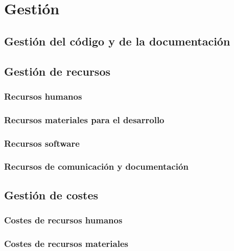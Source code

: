 \chapter{Gestión}

\section{Gestión del código y de la documentación}






\section{Gestión de recursos}

\subsection{Recursos humanos}



\subsection{Recursos materiales para el desarrollo}



\subsection{Recursos software}




\subsection{Recursos de comunicación y documentación}





\section{Gestión de costes}


\subsection{Costes de recursos humanos}





\subsection{Costes de recursos materiales}




